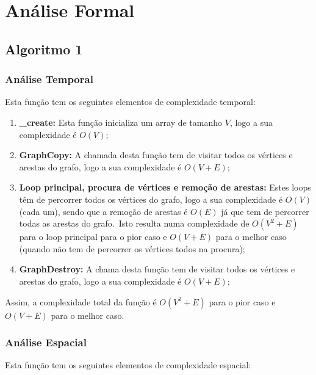 \chapter{Análise Formal}
\label{ch:analise-formal}

\section{Algoritmo 1}
\label{sec:analise-formal:algoritmo-1}

\subsection{Análise Temporal}
\label{sec:analise-formal:algoritmo-1:analise-temporal}

Esta função tem os seguintes elementos de complexidade temporal:

\begin{enumerate}
    \item \textbf{\_create:} Esta função inicializa um array de tamanho $V$, logo a sua complexidade é $O(V)$;
    \item \textbf{GraphCopy:} A chamada desta função tem de visitar todos os vértices e arestas do grafo, logo a sua complexidade é $O(V + E)$;
    \item \textbf{Loop principal, procura de vértices e remoção de arestas:} Estes loops têm de percorrer todos os vértices do grafo, logo a sua complexidade é $O(V)$ (cada um), sendo que a remoção de arestas é $O(E)$ já que tem de percorrer todas as arestas do grafo.\ Isto resulta numa complexidade de $O(V^2 + E)$ para o loop principal para o pior caso e $O(V + E)$ para o melhor caso (quando não tem de percorrer os vértices todos na procura);
    \item \textbf{GraphDestroy:} A chama desta função tem de visitar todos os vértices e arestas do grafo, logo a sua complexidade é $O(V + E)$;
\end{enumerate}

Assim, a complexidade total da função é $O(V^2 + E)$ para o pior caso e $O(V + E)$ para o melhor caso.

\subsection{Análise Espacial}
\label{sec:analise-formal:algoritmo-1:analise-espacial}

Esta função tem os seguintes elementos de complexidade espacial:

